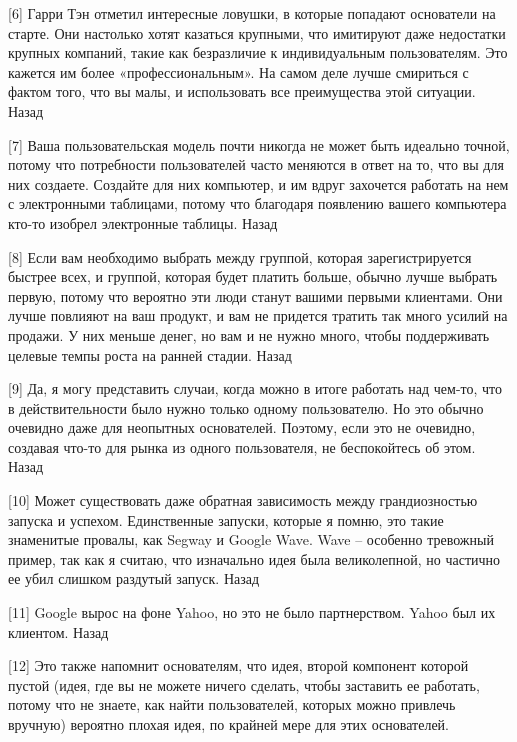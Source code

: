 \documentclass[ebook,12pt,oneside,openany]{memoir}
\begin{document}
[6] Гарри Тэн отметил интересные ловушки, в которые попадают
основатели на старте. Они настолько хотят казаться крупными, что
имитируют даже недостатки крупных компаний, такие как безразличие к
индивидуальным пользователям. Это кажется им более «профессиональным».
На самом деле лучше смириться с фактом того, что вы малы, и
использовать все преимущества этой ситуации. Назад \newline

[7] Ваша пользовательская модель почти никогда не может быть идеально
точной, потому что потребности пользователей часто меняются в ответ на
то, что вы для них создаете. Создайте для них компьютер, и им вдруг
захочется работать на нем с электронными таблицами, потому что
благодаря появлению вашего компьютера кто-то изобрел электронные
таблицы. Назад \newline

[8] Если вам необходимо выбрать между группой, которая
зарегистрируется быстрее всех, и группой, которая будет платить
больше, обычно лучше выбрать первую, потому что вероятно эти люди
станут вашими первыми клиентами. Они лучше повлияют на ваш продукт, и
вам не придется тратить так много усилий на продажи. У них меньше
денег, но вам и не нужно много, чтобы поддерживать целевые темпы роста
на ранней стадии. Назад \newline

[9] Да, я могу представить случаи, когда можно в итоге работать над
чем-то, что в действительности было нужно только одному пользователю.
Но это обычно очевидно даже для неопытных основателей. Поэтому, если
это не очевидно, создавая что-то для рынка из одного пользователя, не
беспокойтесь об этом. Назад \newline

[10] Может существовать даже обратная зависимость между грандиозностью
запуска и успехом. Единственные запуски, которые я помню, это такие
знаменитые провалы, как Segway и Google Wave. Wave – особенно
тревожный пример, так как я считаю, что изначально идея была
великолепной, но частично ее убил слишком раздутый запуск. Назад \newline

[11] Google вырос на фоне Yahoo, но это не было партнерством. Yahoo
был их клиентом. Назад \newline

[12] Это также напомнит основателям, что идея, второй компонент
которой пустой (идея, где вы не можете ничего сделать, чтобы заставить
ее работать, потому что не знаете, как найти пользователей, которых
можно привлечь вручную) вероятно плохая идея, по крайней мере для этих
основателей.
\end{document}
